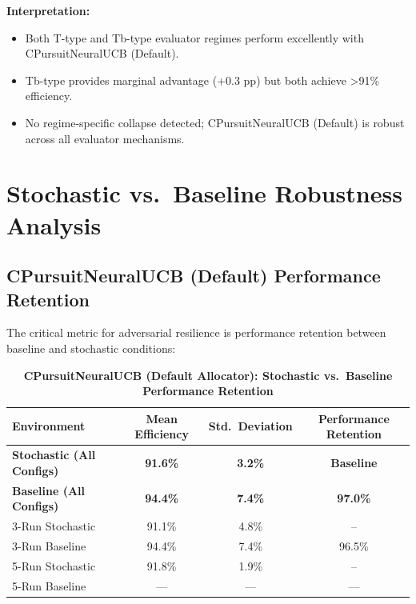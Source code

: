 \documentclass[12pt,a4paper]{article}
\newcommand{\success}[1]{\textcolor{successcolor}{\textbf{#1}}}
\begin{document}
\textbf{Interpretation:}
\begin{itemize}
\item Both T-type and Tb-type evaluator regimes perform excellently with CPursuitNeuralUCB (Default).
\item Tb-type provides marginal advantage (+0.3 pp) but both achieve >91\% efficiency.
\item No regime-specific collapse detected; CPursuitNeuralUCB (Default) is robust across all evaluator mechanisms.
\end{itemize}

\section{Stochastic vs.\ Baseline Robustness Analysis}

\subsection{CPursuitNeuralUCB (Default) Performance Retention}

The critical metric for adversarial resilience is performance retention between baseline and stochastic conditions:

\begin{table}[H]
\centering
\caption{\success{CPursuitNeuralUCB (Default Allocator): Stochastic vs.\ Baseline Performance Retention}}
\begin{tabular}{|l|c|c|c|}
\hline
\textbf{Environment} & \textbf{Mean Efficiency} & \textbf{Std.\ Deviation} & \textbf{Performance Retention} \\
\hline
\success{Stochastic (All Configs)} & \success{91.6\%} & \success{3.2\%} & \success{Baseline} \\
\success{Baseline (All Configs)}   & \success{94.4\%} & \success{7.4\%} & \success{97.0\%} \\
\midrule
3-Run Stochastic & 91.1\% & 4.8\% & -- \\
3-Run Baseline   & 94.4\% & 7.4\% & 96.5\% \\
5-Run Stochastic & 91.8\% & 1.9\% & -- \\
5-Run Baseline   & --- & --- & --- \\
\hline
\end{tabular}
\end{table}
\end{document}
